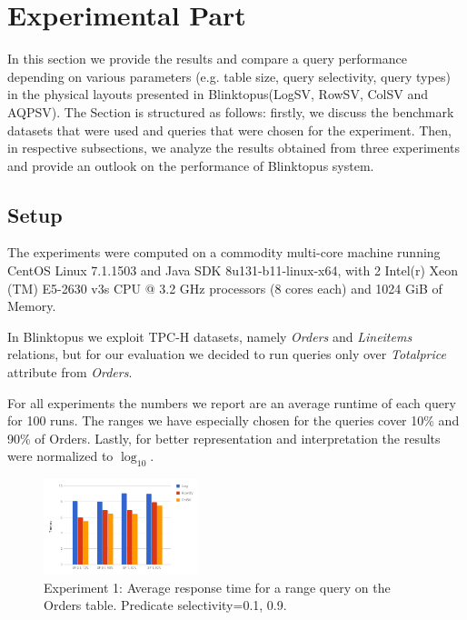 \documentclass[10pt, conference, compsocconf]{IEEEtran}
\begin{document}
\section{Experimental Part}
In this section we provide the results and compare a query performance depending on various parameters (e.g. table size, query selectivity, query types) in the physical layouts presented in Blinktopus(LogSV, RowSV, ColSV and AQPSV). The Section is structured as follows: firstly, we discuss the benchmark datasets that were used and queries that were chosen for the experiment. Then, in respective subsections, we analyze the results obtained from three experiments and provide an outlook on the performance of Blinktopus system.

\label{subsec:Setup}
\subsection{Setup}
The experiments were computed on a commodity multi-core machine running CentOS Linux 7.1.1503 and Java SDK 8u131-b11-linux-x64, with 2 Intel(r) Xeon (TM) E5-2630 v3s CPU @ 3.2 GHz processors (8 cores each) and 1024 GiB of Memory. 

In Blinktopus we exploit TPC-H datasets, namely \textit{Orders} and \textit{Lineitems} relations, but for our evaluation we decided to run queries only over \textit{Totalprice} attribute from \textit{Orders}.

For all experiments the numbers we report are an average runtime of each query for 100 runs. The ranges we have especially chosen for the queries cover 10\% and 90\% of Orders. Lastly, for better representation and interpretation the results were normalized to $\log_{10}$.

\label{fig:exp1}
\begin{figure} \includegraphics[width=0.4\textwidth, center]{img/exp1.png} 
\caption{Experiment 1: Average response time for a range query on the Orders table. Predicate selectivity=0.1, 0.9.}
\end{figure}
\end{document}
